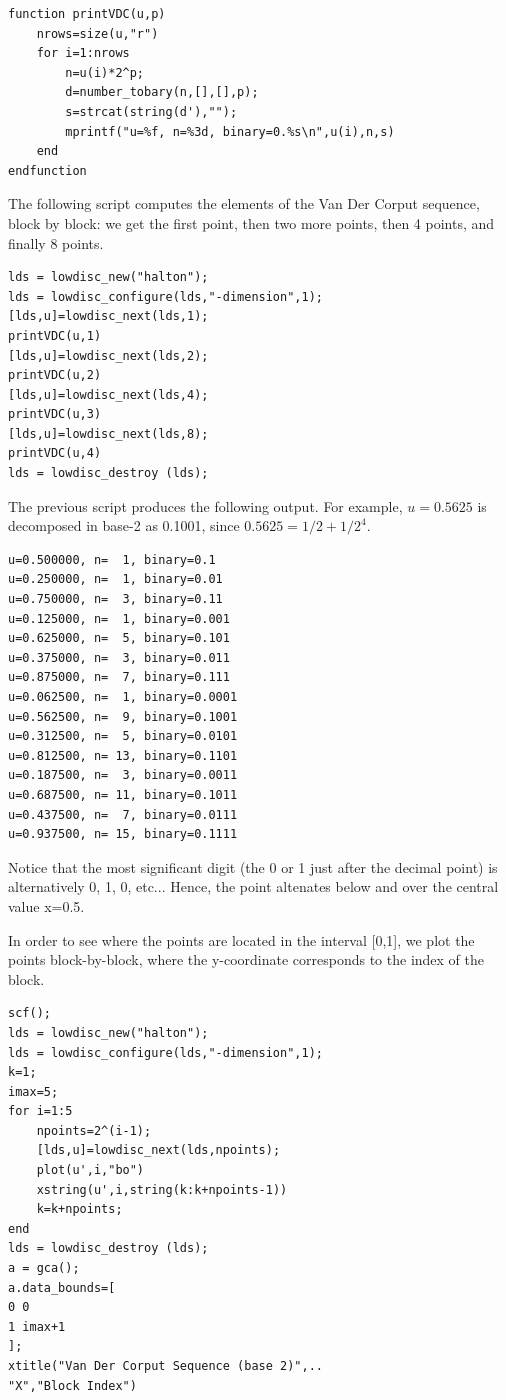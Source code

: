 \lstset{language=scilabscript}
\begin{lstlisting}
function printVDC(u,p)
    nrows=size(u,"r")
    for i=1:nrows
        n=u(i)*2^p;
        d=number_tobary(n,[],[],p);
        s=strcat(string(d'),"");
        mprintf("u=%f, n=%3d, binary=0.%s\n",u(i),n,s)
    end
endfunction
\end{lstlisting}

    
      The following script computes the elements of the Van Der Corput 
	  sequence, block by block: 
	  we get the first point, then two more points, then 4 points, 
	  and finally 8 points.
    

\lstset{language=scilabscript}
\begin{lstlisting}
lds = lowdisc_new("halton");
lds = lowdisc_configure(lds,"-dimension",1);
[lds,u]=lowdisc_next(lds,1);
printVDC(u,1)
[lds,u]=lowdisc_next(lds,2);
printVDC(u,2)
[lds,u]=lowdisc_next(lds,4);
printVDC(u,3)
[lds,u]=lowdisc_next(lds,8);
printVDC(u,4)
lds = lowdisc_destroy (lds);
\end{lstlisting}

    
      The previous script produces the following output.
	  For example, $u=0.5625$ is decomposed in base-2 as 0.1001, 
	  since $0.5625=1/2+1/2^4$.
    

\lstset{language=scilabscript}
\begin{lstlisting}
u=0.500000, n=  1, binary=0.1
u=0.250000, n=  1, binary=0.01
u=0.750000, n=  3, binary=0.11
u=0.125000, n=  1, binary=0.001
u=0.625000, n=  5, binary=0.101
u=0.375000, n=  3, binary=0.011
u=0.875000, n=  7, binary=0.111
u=0.062500, n=  1, binary=0.0001
u=0.562500, n=  9, binary=0.1001
u=0.312500, n=  5, binary=0.0101
u=0.812500, n= 13, binary=0.1101
u=0.187500, n=  3, binary=0.0011
u=0.687500, n= 11, binary=0.1011
u=0.437500, n=  7, binary=0.0111
u=0.937500, n= 15, binary=0.1111
\end{lstlisting}

    
      Notice that the most significant digit (the 0 or 1 just after the 
	  decimal point) is alternatively 0, 1, 0, etc... 
	  Hence, the point altenates below and over the central value x=0.5.
    

    
      In order to see where the points are located in the interval [0,1], 
	  we plot the points block-by-block, where the y-coordinate corresponds 
	  to the index of the block.
    
	
\lstset{language=scilabscript}
\begin{lstlisting}
scf();
lds = lowdisc_new("halton");
lds = lowdisc_configure(lds,"-dimension",1);
k=1;
imax=5;
for i=1:5
    npoints=2^(i-1);
    [lds,u]=lowdisc_next(lds,npoints);
    plot(u',i,"bo")
    xstring(u',i,string(k:k+npoints-1))
    k=k+npoints;
end
lds = lowdisc_destroy (lds);
a = gca();
a.data_bounds=[
0 0
1 imax+1
];
xtitle("Van Der Corput Sequence (base 2)",..
"X","Block Index")
\end{lstlisting}

